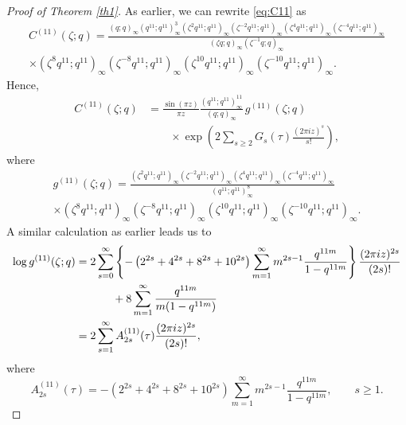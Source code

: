 \documentclass[12pt,oneside,reqno]{amsart}
\numberwithin{equation}{section}
\begin{document}
\begin{proof}[Proof of Theorem \ref{th1}]
	As earlier, we can rewrite \eqref{eq:C11} as 
	\begin{equation}
		\begin{aligned}
			C^{(11)}(\zeta;q)
			=
			\frac{
				(q;q)_{\infty}(q^{11};q^{11})_{\infty}^{3}
				(\zeta^{2}q^{11};q^{11})_{\infty}
				(\zeta^{-2}q^{11};q^{11})_{\infty}
				(\zeta^{4}q^{11};q^{11})_{\infty}
				(\zeta^{-4}q^{11};q^{11})_{\infty}
			}{(\zeta q;q)_{\infty}(\zeta^{-1}q;q)_{\infty}}
			\\[2mm]
			\times
			(\zeta^{8}q^{11};q^{11})_{\infty}
			(\zeta^{-8}q^{11};q^{11})_{\infty}
			(\zeta^{10}q^{11};q^{11})_{\infty}
			(\zeta^{-10}q^{11};q^{11})_{\infty}.
		\end{aligned}
		\label{eq:11corecrank}
	\end{equation}
	Hence,
	\begin{equation}
		\begin{aligned}
			C^{(11)}(\zeta;q)
			&=
			\frac{\sin(\pi z)}{\pi z}
			\frac{(q^{11};q^{11})_{\infty}^{11}}
			{(q;q)_{\infty}}
			\,g^{(11)}(\zeta;q)      \\
			&\qquad\times
			\exp\left(
			2\sum_{s\ge2}
			G_s(\tau)
			\frac{(2\pi iz)^s}{s!}
			\right),
		\end{aligned}
		\label{eq:11gexp}
	\end{equation}
	where
	\begin{equation}
		\begin{aligned}
			g^{(11)}(\zeta;q)
			=
			\frac{
				(\zeta^{2}q^{11};q^{11})_{\infty}
				(\zeta^{-2}q^{11};q^{11})_{\infty}
				(\zeta^{4}q^{11};q^{11})_{\infty}
				(\zeta^{-4}q^{11};q^{11})_{\infty}
			}
			{(q^{11};q^{11})_{\infty}^{8}}
			\\[2mm]
			\times
			(\zeta^{8}q^{11};q^{11})_{\infty}
			(\zeta^{-8}q^{11};q^{11})_{\infty}
			(\zeta^{10}q^{11};q^{11})_{\infty}
			(\zeta^{-10}q^{11};q^{11})_{\infty}.
		\end{aligned}
		\label{eq:11g}
	\end{equation} 
	A similar calculation as earlier leads us to
	\begin{align}
		\log g^{(11)}(\zeta;q)
		={}&
		2\sum_{s=0}^{\infty}
		\left\{
		-\left(
		2^{2s}+4^{2s}+8^{2s}+10^{2s}
		\right)
		\sum_{m=1}^{\infty}
		m^{2s-1}
		\frac{q^{11m}}
		{1-q^{11m}}
		\right\}
		\frac{(2\pi iz)^{2s}}{(2s)!}
		\notag\\
		&\qquad
		+
		8\sum_{m=1}^{\infty}
		\frac{q^{11m}}
		{m(1-q^{11m})}
		\notag\\
		={}&
		2\sum_{s=1}^{\infty}
		A^{(11)}_{2s}(\tau)
		\frac{(2\pi iz)^{2s}}{(2s)!},
		\label{eq:11coreA}
	\end{align}
	where
	\begin{equation}
		A^{(11)}_{2s}(\tau)
		=
		-\left(
		2^{2s}+4^{2s}+8^{2s}+10^{2s}
		\right)
		\sum_{m=1}^{\infty}
		m^{2s-1}
		\frac{q^{11m}}
		{1-q^{11m}},
		\qquad s\ge1.
	\end{equation}
	

\end{proof}
\end{document}
